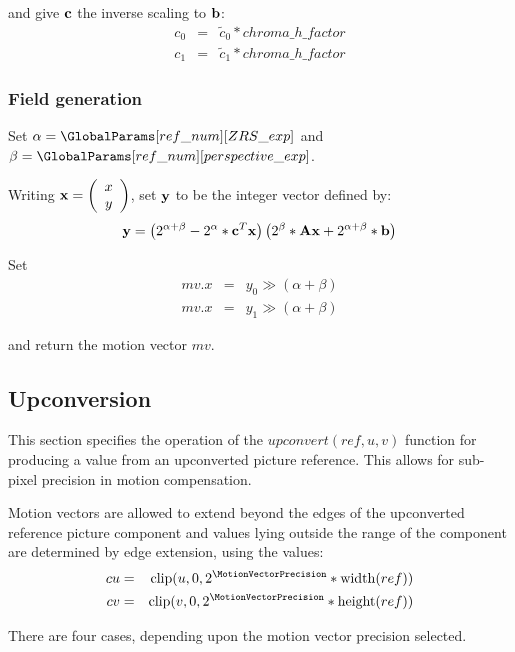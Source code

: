 and give ${\bf c}$ the inverse scaling to ${\bf b}$:
\begin{eqnarray*}
c_0 & = & \tilde{c}_0*chroma\_h\_factor \\
c_1 & = & \tilde{c}_1*chroma\_h\_factor
\end{eqnarray*}

\subsubsection{Field generation}

Set $\alpha = \GlobalParams[ref\_num][ZRS\_exp]$ and 
$\beta =\GlobalParams[ref\_num][perspective\_exp]$.

Writing ${\bf x}=\left( \begin{array}{c} x\\y \end{array}\right)$, set ${\bf y}$ to be
the integer vector defined by:
\begin{equation*}
{\bf y}=\left(2^{\alpha+\beta}-2^\alpha * {\bf c}^T {\bf x}\right)\left(2^\beta*{\bf Ax}+2^{\alpha+\beta}*{\bf b}\right)
\end{equation*}

Set
\begin{eqnarray*}
mv.x & = & y_0\gg (\alpha+\beta) \\
mv.x & = & y_1\gg (\alpha+\beta)
\end{eqnarray*}

and return the motion vector $mv$.

\subsection{Upconversion}
\label{upconvert}

This section specifies the operation of the $upconvert(ref, u, v)$ function
for producing a value from an upconverted picture reference. This
allows for sub-pixel precision in motion compensation.

Motion vectors are allowed to extend beyond the edges of the 
upconverted reference picture component and values lying outside the range
of the component are determined by edge extension, using the values:
\begin{eqnarray*}
cu & = &\clip(u, 0, 2^\MotionVectorPrecision*\width(ref)) \\
cv & = &\clip(v, 0, 2^\MotionVectorPrecision*\height(ref))
\end{eqnarray*}

There are four cases, depending upon the motion vector precision selected.

